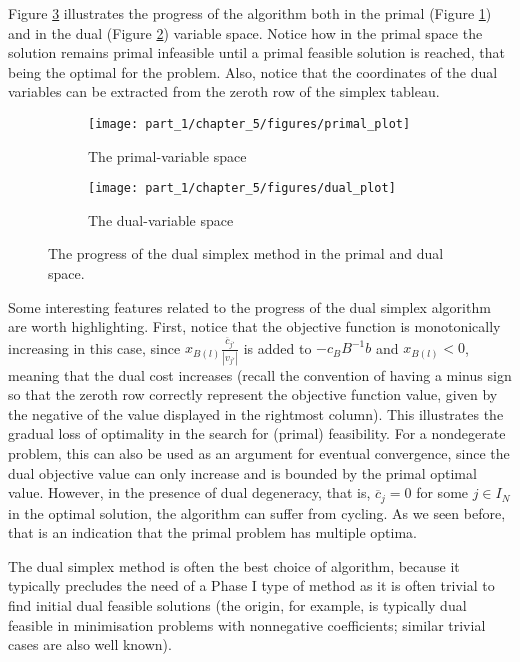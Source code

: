 Figure \ref{p1c5:fig:ex1} illustrates the progress of the algorithm both in the primal (Figure \ref{p1c5:fig:ex1_P}) and in the dual (Figure \ref{p1c5:fig:ex1_D}) variable space. Notice how in the primal space the solution remains primal infeasible until a primal feasible solution is reached, that being the optimal for the problem. Also, notice that the coordinates of the dual variables can be extracted from the zeroth row of the simplex tableau.

\begin{figure}[h]
	\centering
	\begin{subfigure}{0.45\textwidth}
		\centering
		\texttt{[image: part\_1/chapter\_5/figures/primal\_plot]}
		\caption{The primal-variable space}\label{p1c5:fig:ex1_P}
	\end{subfigure}
	\begin{subfigure}{0.45\textwidth}
		\centering
		\texttt{[image: part\_1/chapter\_5/figures/dual\_plot]}
		\caption{The dual-variable space}\label{p1c5:fig:ex1_D}
	\end{subfigure}
	\caption{The progress of the dual simplex method in the primal and dual space.}	\label{p1c5:fig:ex1}
\end{figure}

Some interesting features related to the progress of the dual simplex algorithm are worth highlighting. First, notice that the objective function is monotonically increasing in this case, since $x_{B(l)}\frac{\overline{c}_{j'}}{|v_{j'}|}$ is added to $-c_BB^{-1}b$ and $x_{B(l)} < 0$, meaning that the dual cost increases (recall the convention of having a minus sign so that the zeroth row correctly represent the objective function value, given by the negative of the value displayed in the rightmost column). This illustrates the gradual loss of optimality in the search for (primal) feasibility. For a nondegerate problem, this can also be used as an argument for eventual convergence, since the dual objective value can only increase and is bounded by the primal optimal value. However, in the presence of dual degeneracy, that is, $\overline{c}_{j} = 0$ for some $j \in I_N$ in the optimal solution, the algorithm can suffer from cycling. As we seen before, that is an indication that the primal problem has multiple optima. 

The dual simplex method is often the best choice of algorithm, because it typically precludes the need of a Phase I type of method as it is often trivial to find initial dual feasible solutions (the origin, for example, is typically dual feasible in minimisation problems with nonnegative coefficients; similar trivial cases are also well known).

